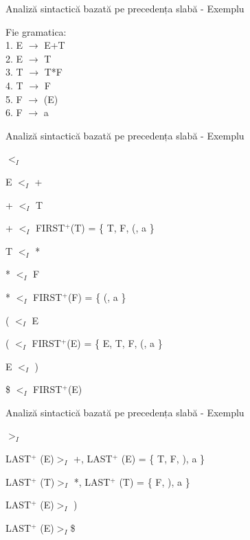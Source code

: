 \documentclass[pdf]{beamer}
\begin{document}
\begin{frame}{Analiză sintactică bazată pe precedența slabă - Exemplu}

Fie gramatica:
\\ 1. E $\rightarrow$ E+T
\\ 2. E $\rightarrow$ T
\\ 3. T $\rightarrow$ T*F
\\ 4. T $\rightarrow$ F
\\ 5. F $\rightarrow$ (E)
\\ 6. F $\rightarrow$ a

\end{frame}



\begin{frame}{Analiză sintactică bazată pe precedența slabă - Exemplu}

$<_I$
\newline

E $<_{I}$ +

+ $<_{I}$ T

+ $<_{I}$ FIRST$^+$(T) = \{ T, F, (, a \}

T $<_{I}$ * 

* $<_{I}$ F

* $<_{I}$ FIRST$^+$(F) = \{ (, a \}

( $<_{I}$ E

( $<_{I}$ FIRST$^+$(E) = \{ E, T, F, (, a \}

E $<_{I}$ ) 

\$ $<_{I}$ FIRST$^+$(E)

\end{frame}



\begin{frame}{Analiză sintactică bazată pe precedența slabă - Exemplu}

$>_I$
\newline

LAST$^+$ (E)$>_{I}$ +, LAST$^+$ (E) = \{ T, F, ), a \}

LAST$^+$ (T)$>_{I}$ *, LAST$^+$ (T) = \{ F, ), a \}

LAST$^+$ (E)$>_{I}$ )

LAST$^+$ (E)$>_{I}$\$

\end{frame}
\end{document}

